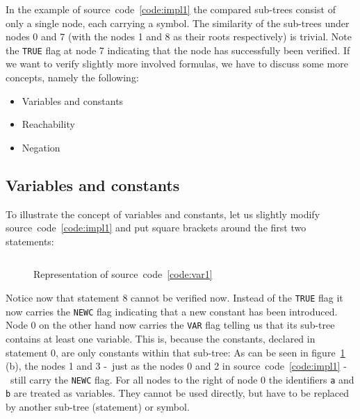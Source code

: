\documentclass[british]{article}
\newenvironment{code}{\captionsetup{type=listing}}{}
\newcommand\prv{bc}
\newcommand\m[1]{\texttt{#1}}
\begin{document}
In the example of source~code~\ref{code:impl1} the compared sub-trees consist of
only a single node, each carrying a symbol. The similarity of the sub-trees
under nodes 0 and 7 (with the nodes 1 and 8 as their roots respectively) is
trivial. Note the \texttt{TRUE} flag at node 7 indicating that the node has
successfully been verified. If we want to verify slightly more involved
formulas, we have to discuss some more concepts, namely the following:

\begin{itemize}
	\item 
		Variables and constants
	\item 
		Reachability
	\item 
		Negation
\end{itemize}

\pagebreak{}

\subsection{Variables and constants} \label{sec:var}

To illustrate the concept of variables and constants, let us slightly modify
source~code~\ref{code:impl1} and put square brackets around the first two
statements:

\begin{code}
\label{code:var1}
\inputminted[linenos]{\prv}{examples/var1.prove}
\end{code}

\begin{figure}[!h]
\caption{Representation of source~code~\ref{code:var1}}\label{fig:var1}
\centering
{}
\end{figure}

Notice now that statement 8 cannot be verified now. Instead of the \texttt{TRUE}
flag it now carries the \texttt{NEWC} flag indicating that a new constant has
been introduced. Node 0 on the other hand now carries the \texttt{VAR} flag
telling us that its sub-tree contains at least one variable.
This is, because the constants, declared in statement 0, are only constants
within that sub-tree: 
As can be seen in figure~\ref{fig:var1} (b), the nodes 1 and 3 -\ just as the
nodes 0 and 2 in source~code~\ref{code:impl1} -\ still carry the \texttt{NEWC}
flag.
For all nodes to the right of node 0 the identifiers \m{a} and \m{b} are treated
as variables. They cannot be used directly, but have to be replaced by another
sub-tree (statement) or symbol.
\end{document}
